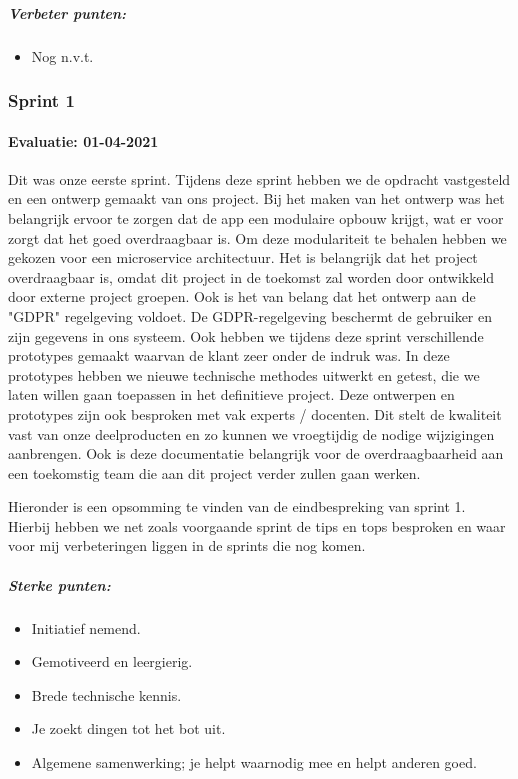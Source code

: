 	\subparagraph{Verbeter punten:}
	\begin{itemize}
		\setlength{\itemsep}{0pt}%
		\setlength{\parskip}{0pt}%
		\item Nog n.v.t.
	\end{itemize}



	\subsubsection{Sprint 1}
	\paragraph{Evaluatie: 01-04-2021}
	Dit was onze eerste sprint. Tijdens deze sprint hebben we de opdracht vastgesteld en een ontwerp gemaakt van ons project.
	Bij het maken van het ontwerp was het belangrijk ervoor te zorgen dat de app een modulaire opbouw krijgt, wat er voor zorgt dat het goed overdraagbaar is.
	Om deze modulariteit te behalen hebben we gekozen voor een microservice architectuur.
	Het is belangrijk dat het project overdraagbaar is, omdat dit project in de toekomst zal worden door ontwikkeld door externe project groepen.
	Ook is het van belang dat het ontwerp aan de "GDPR" regelgeving voldoet.
	De GDPR-regelgeving beschermt de gebruiker en zijn gegevens in ons systeem.
	Ook hebben we tijdens deze sprint verschillende prototypes gemaakt waarvan de klant zeer onder de indruk was.
	In deze prototypes hebben we nieuwe technische methodes uitwerkt en getest, die we laten willen gaan toepassen in het definitieve project.
	Deze ontwerpen en prototypes zijn ook besproken met vak experts / docenten.
	Dit stelt de kwaliteit vast van onze deelproducten en zo kunnen we vroegtijdig de nodige wijzigingen aanbrengen.
	Ook is deze documentatie belangrijk voor de overdraagbaarheid aan een toekomstig team die aan dit project verder
	zullen gaan werken.


	Hieronder is een opsomming te vinden van de eindbespreking van sprint 1.
	Hierbij hebben we net zoals voorgaande sprint de tips en tops besproken en waar voor mij verbeteringen liggen in de
	sprints die nog komen.
	\subparagraph{Sterke punten:}
	\begin{itemize}
		\setlength{\itemsep}{0pt}%
		\setlength{\parskip}{0pt}%
		\item Initiatief nemend.
		\item Gemotiveerd en leergierig.
		\item Brede technische kennis.
		\item Je zoekt dingen tot het bot uit.
		\item Algemene samenwerking; je helpt waarnodig mee en helpt anderen goed.
	\end{itemize}

